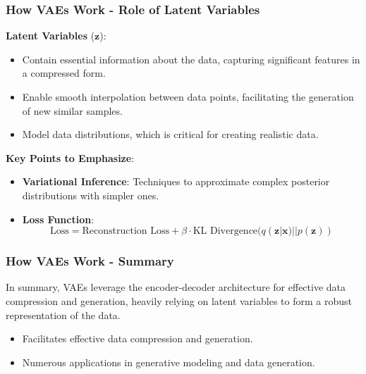 \documentclass[aspectratio=169]{beamer}
\begin{document}
\begin{frame}[fragile]
    \frametitle{How VAEs Work - Role of Latent Variables}
    
    \textbf{Latent Variables} (\( \mathbf{z} \)):
    
    \begin{itemize}
        \item Contain essential information about the data, capturing significant features in a compressed form.
        \item Enable smooth interpolation between data points, facilitating the generation of new similar samples.
        \item Model data distributions, which is critical for creating realistic data.
    \end{itemize}

    \textbf{Key Points to Emphasize}:
    
    \begin{itemize}
        \item \textbf{Variational Inference}: Techniques to approximate complex posterior distributions with simpler ones.
        \item \textbf{Loss Function}: 
        \begin{equation}
            \text{Loss} = \text{Reconstruction Loss} + \beta \cdot \text{KL Divergence}(q(\mathbf{z} | \mathbf{x}) || p(\mathbf{z}))
        \end{equation}
    \end{itemize}

\end{frame}

\begin{frame}[fragile]
    \frametitle{How VAEs Work - Summary}
    
    In summary, VAEs leverage the encoder-decoder architecture for effective data compression and generation, heavily relying on latent variables to form a robust representation of the data. 

    \begin{itemize}
        \item Facilitates effective data compression and generation.
        \item Numerous applications in generative modeling and data generation.
    \end{itemize}

\end{frame}
\end{document}
